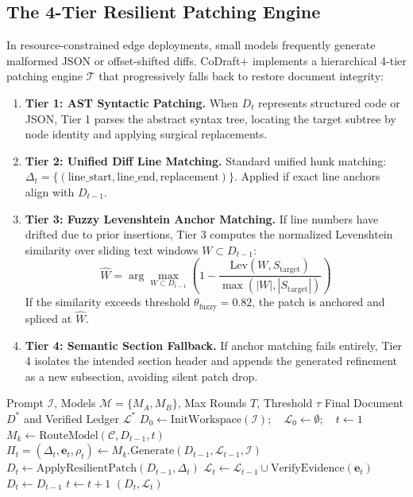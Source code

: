 \documentclass[10pt,journal,compsoc]{IEEEtran}
\begin{document}
\subsection{The 4-Tier Resilient Patching Engine}
In resource-constrained edge deployments, small models frequently generate malformed JSON or offset-shifted diffs. CoDraft+ implements a hierarchical 4-tier patching engine $\mathcal{T}$ that progressively falls back to restore document integrity:
\begin{enumerate}
    \item \textbf{Tier 1: AST Syntactic Patching.} When $D_t$ represents structured code or JSON, Tier 1 parses the abstract syntax tree, locating the target subtree by node identity and applying surgical replacements.
    \item \textbf{Tier 2: Unified Diff Line Matching.} Standard unified hunk matching: $\Delta_t = \{(\text{line\_start}, \text{line\_end}, \text{replacement})\}$. Applied if exact line anchors align with $D_{t-1}$.
    \item \textbf{Tier 3: Fuzzy Levenshtein Anchor Matching.} If line numbers have drifted due to prior insertions, Tier 3 computes the normalized Levenshtein similarity over sliding text windows $W \subset D_{t-1}$:
    \begin{equation}
    \hat{W} = \arg\max_{W \subset D_{t-1}} \left( 1 - \frac{\text{Lev}(W, S_{\text{target}})}{\max(|W|, |S_{\text{target}}|)} \right)
    \end{equation}
    If the similarity exceeds threshold $\theta_{\text{fuzzy}} = 0.82$, the patch is anchored and spliced at $\hat{W}$.
    \item \textbf{Tier 4: Semantic Section Fallback.} If anchor matching fails entirely, Tier 4 isolates the intended section header and appends the generated refinement as a new subsection, avoiding silent patch drop.
\end{enumerate}

\begin{algorithm}[h]
\caption{CoDraft+ Adaptive Collaborative Loop}
\label{algo:loop}
\begin{algorithmic}[1]
\REQUIRE Prompt $\mathcal{I}$, Models $\mathcal{M} = \{M_A, M_B\}$, Max Rounds $T$, Threshold $\tau$
\ENSURE Final Document $D^*$ and Verified Ledger $\mathcal{L}^*$
\STATE $D_0 \leftarrow \text{InitWorkspace}(\mathcal{I}); \quad \mathcal{L}_0 \leftarrow \emptyset; \quad t \leftarrow 1$
    \STATE $M_k \leftarrow \text{RouteModel}(\mathcal{C}, D_{t-1}, t)$
    \STATE $\Pi_t = (\Delta_t, \mathbf{e}_t, \rho_t) \leftarrow M_k.\text{Generate}(D_{t-1}, \mathcal{L}_{t-1}, \mathcal{I})$
    \STATE $D_t \leftarrow \text{ApplyResilientPatch}(D_{t-1}, \Delta_t)$ 
    \STATE $\mathcal{L}_t \leftarrow \mathcal{L}_{t-1} \cup \text{VerifyEvidence}(\mathbf{e}_t)$
        \STATE $D_t \leftarrow D_{t-1}$ 
    \ENDIF
    \STATE $t \leftarrow t + 1$
\ENDWHILE
\RETURN $(D_t, \mathcal{L}_t)$
\end{algorithmic}
\end{algorithm}
\end{document}
